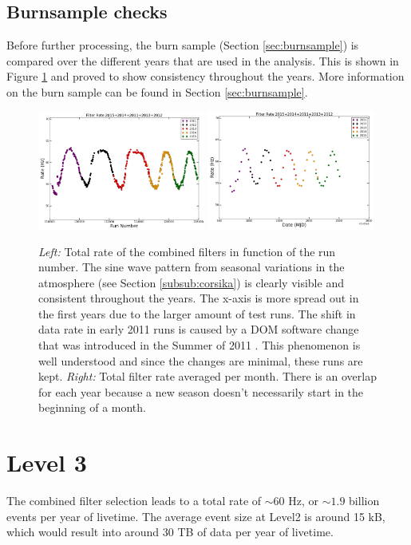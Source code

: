 \subsection{Burnsample checks}
Before further processing, the burn sample (Section \ref{sec:burnsample}) is compared over the different years that are used in the analysis. This is shown in Figure \ref{fig:burnsamplechecks} and proved to show consistency throughout the years. More information on the burn sample can be found in Section \ref{sec:burnsample}.

\begin{figure}[t]
\centering
\includegraphics[width=0.49\textwidth]{chapter8/img/FilterRatePerRun.png}
\includegraphics[width=0.49\textwidth]{chapter8/img/FilterRatePerMonth.png}
\caption{\textit{Left: }Total rate of the combined filters in function of the run number. The sine wave pattern from seasonal variations in the atmosphere (see Section \ref{subsub:corsika}) is clearly visible and consistent throughout the years. The x-axis is more spread out in the first years due to the larger amount of test runs. The shift in data rate in early 2011 runs is caused by a DOM software change that was introduced in the Summer of 2011 \cite{2011rate}. This phenomenon is well understood and since the changes are minimal, these runs are kept. \textit{Right: }Total filter rate averaged per month. There is an overlap for each year because a new season doesn't necessarily start in the beginning of a month.}
\label{fig:burnsamplechecks}
\end{figure}

\section{Level 3}
The combined filter selection leads to a total rate of $\sim60$ Hz, or $\sim1.9$ billion events per year of livetime. The average event size at Level2 is around 15 kB, which would result into around 30 TB of data per year of livetime.


